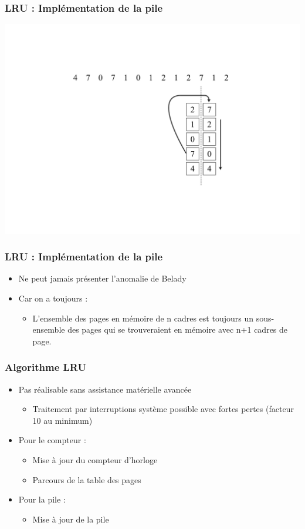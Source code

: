 \begin{frame}
\frametitle{LRU : Implémentation de la pile}
\includegraphics[width=.8\textwidth]{../illustration/remplacement_lru_pile.pdf}
\end{frame}


\begin{frame}
\frametitle{LRU : Implémentation de la pile}
\begin{itemize}
\item Ne peut jamais présenter l'anomalie de Belady
\item Car on a toujours :
\begin{itemize}
\item L'ensemble des pages en mémoire de n cadres est toujours un sous-ensemble des pages qui se trouveraient en mémoire avec n+1 cadres de page.
\end{itemize}
\end{itemize}
\end{frame}


\begin{frame}
\frametitle{Algorithme LRU}
\begin{itemize}
\item Pas réalisable sans assistance matérielle avancée
\begin{itemize}
\item Traitement par interruptions système possible avec fortes pertes (facteur 10 au minimum)
\end{itemize}
\item Pour le compteur :
\begin{itemize}
\item Mise à jour du compteur d'horloge
\item Parcours de la table des pages
\end{itemize}
\item Pour la pile :
\begin{itemize}
\item Mise à jour de la pile
\end{itemize}
\end{itemize}
\end{frame}



